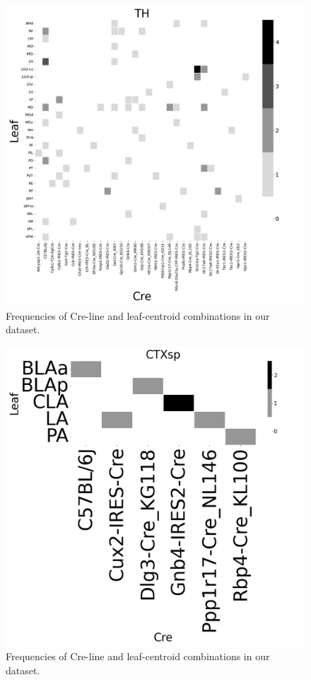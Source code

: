 \begin{figure}[H]
    \centering
    \includegraphics[width = 7in]{figs/TH centroid density.png}
    \caption{Frequencies of Cre-line and leaf-centroid combinations in our dataset.}
    \label{fig:my_label}
\end{figure}
\newpage

\begin{figure}[H]
    \centering
    \includegraphics[width = 7in]{figs/CTXsp centroid density.png}
    \caption{Frequencies of Cre-line and leaf-centroid combinations in our dataset.}
    \label{fig:my_label}
\end{figure}
\newpage

